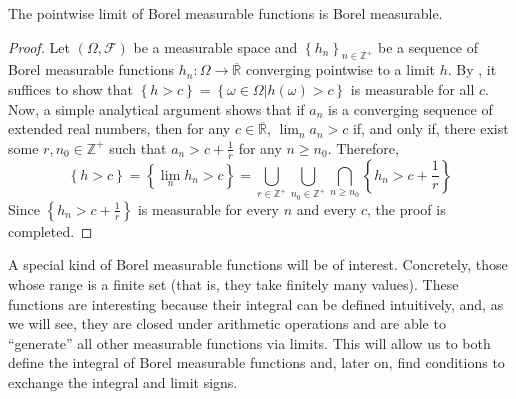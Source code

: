 \begin{prop}\label{proposition:limit of Borel is Borel} The pointwise
limit of Borel measurable functions is Borel measurable.
\end{prop}
\begin{proof} Let \(\left(\Omega,\mathcal{F}\right)\) be a measurable space and
\(\left\{h_n\right\}_{n\in\mathbb{Z}^+}\) be a sequence of Borel measurable
functions \(h_n\colon\Omega\to\overline{\mathbb{R}}\) converging pointwise to a limit \(h\).  By
, it suffices to show that
\(\left\{h>c\right\}=\left\{\omega\in\Omega\left|h(\omega)>c\right.\right\}\) is measurable
for all \(c\). Now, a simple analytical argument shows that if \(a_n\) is a converging sequence of extended real numbers, then for any \(c\in\overline{\mathbb{R}}\), \(\lim_na_n>c\) if, and only if, there exist some \(r,n_0\in\mathbb{Z}^+\) such that \(a_n>c+\frac{1}{r}\) for any \(n\geq n_0\). Therefore,
	\[
			\left\{h>c\right\}=\left\{\lim_nh_n>c\right\}=\bigcup_{r\in\mathbb{Z}^+}\bigcup_{n_0\in\mathbb{Z}^+}\bigcap_{n\geq n_0}\left\{h_n>c+\frac{1}{r}\right\}
	\]
	Since \(\left\{h_n>c+\frac{1}{r}\right\}\) is measurable for every \(n\) and every \(c\), the proof is completed.
\end{proof}


A special kind of Borel measurable functions will be of interest. Concretely,
those whose range is a finite set (that is, they take finitely many values).
These functions are interesting because their integral can be defined intuitively,
and, as we will see, they are closed under arithmetic operations and are able to
``generate'' all other measurable functions via limits. This will allow us to
both define the integral of Borel measurable functions and, later on, find
conditions to exchange the integral and limit signs.

